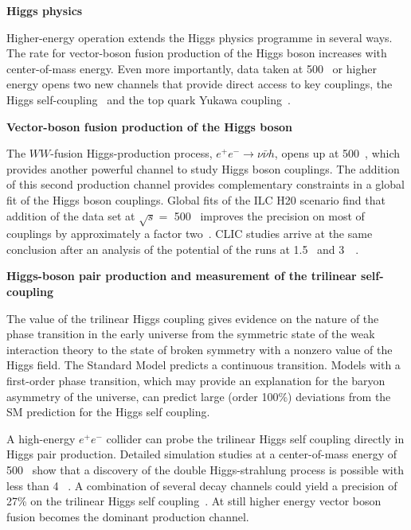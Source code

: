 


{\bf Higgs physics}

Higher-energy operation extends the Higgs physics programme in several ways.
The rate for vector-boson fusion production of the Higgs boson increases with
center-of-mass energy. Even more importantly, data taken
at 500~\GeV{} or higher energy opens two new channels that provide direct
access to key couplings, the Higgs self-coupling~\cite{Barklow:2017awn}
and the top quark Yukawa coupling~\cite{Yonamine:2011jg}.

{\bf Vector-boson fusion production of the Higgs boson}

The $WW$-fusion Higgs-production process,
$e^+e^- \rightarrow \nu \bar{\nu} h$, opens up at 500~\GeV, which
provides another powerful channel to study Higgs boson couplings. The
addition of this second production channel provides complementary
constraints in a global fit of the Higgs boson couplings.
Global fits of the ILC H20 scenario find that addition of the data
set at $\sqrt{s}=$ 500~\GeV{} improves the precision on most of
couplings by approximately a factor two~\cite{Barklow:2017suo}.
CLIC studies arrive at the same conclusion after an analysis of
the potential of the runs at 1.5~\TeV{} and
3~\TeV~\cite{Abramowicz:2016zbo}.

{\bf Higgs-boson pair production and measurement of the trilinear self-coupling}

The value of the trilinear Higgs coupling gives evidence on the nature of the phase
transition  in  the  early  universe  from  the  symmetric  state  of  the  weak  interaction
theory to the state of broken symmetry with a nonzero value of the Higgs field. The
Standard Model predicts a continuous transition. Models with a first-order phase transition,
which may provide an explanation for the baryon asymmetry of the universe,
can predict large (order 100\%) deviations from the SM prediction for the Higgs self coupling.

A high-energy $e^+e^-$ collider can probe the trilinear Higgs self coupling directly in Higgs pair production.
Detailed simulation studies at a center-of-mass energy of 500~\GeV{} show that a discovery of the
double Higgs-strahlung process is possible with less than 4~\invab
. A combination of several decay channels
could yield a precision of 27\% on the trilinear Higgs self coupling~\cite{Duerig:2016dvi}.
At still higher energy vector boson fusion becomes the dominant production channel.

